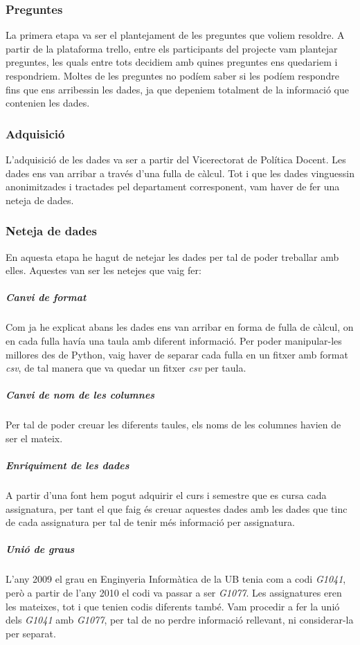 \documentclass[11pt,a4paper,catalan]{article}
\begin{document}
\subsubsection{Preguntes}
La primera etapa va ser el plantejament de les preguntes que voliem resoldre. A partir de la plataforma trello, entre els participants del projecte vam plantejar preguntes, les quals entre tots decidiem amb quines preguntes ens quedariem i respondriem. Moltes de les preguntes no podíem saber si les podíem respondre fins que ens arribessin les dades, ja que depeniem totalment de la informació que contenien les dades.

\subsubsection{Adquisició}
L'adquisició de les dades va ser a partir del Vicerectorat de Política Docent. Les dades ens van arribar a través d'una fulla de càlcul. Tot i que les dades vinguessin anonimitzades i tractades pel departament corresponent, vam haver de fer una neteja de dades.

\subsubsection{Neteja de dades}
En aquesta etapa he hagut de netejar les dades per tal de poder treballar amb elles. Aquestes van ser les netejes que vaig fer:

\subparagraph{Canvi de format}
Com ja he explicat abans les dades ens van arribar en forma de fulla de càlcul, on en cada fulla havía una taula amb diferent informació. Per poder manipular-les millores des de Python, vaig haver de separar cada fulla en un fitxer amb format \textit{csv}, de tal manera que va quedar un fitxer \textit{csv} per taula.

\subparagraph{Canvi de nom de les columnes}
Per tal de poder creuar les diferents taules, els noms de les columnes havien de ser el mateix.

\subparagraph{Enriquiment de les dades}
A partir d'una font hem pogut adquirir el curs i semestre que es cursa cada assignatura, per tant el que faig és creuar aquestes dades amb les dades que tinc de cada assignatura per tal de tenir més informació per assignatura.

\subparagraph{Unió de graus}
L'any 2009 el grau en Enginyeria Informàtica de la UB tenia com a codi \textit{G1041}, però a partir de l'any 2010 el codi va passar a ser \textit{G1077}. Les assignatures eren les mateixes, tot i que tenien codis diferents també. Vam procedir a fer la unió dels \textit{G1041} amb \textit{G1077}, per tal de no perdre informació rellevant, ni considerar-la per separat.
\end{document}
